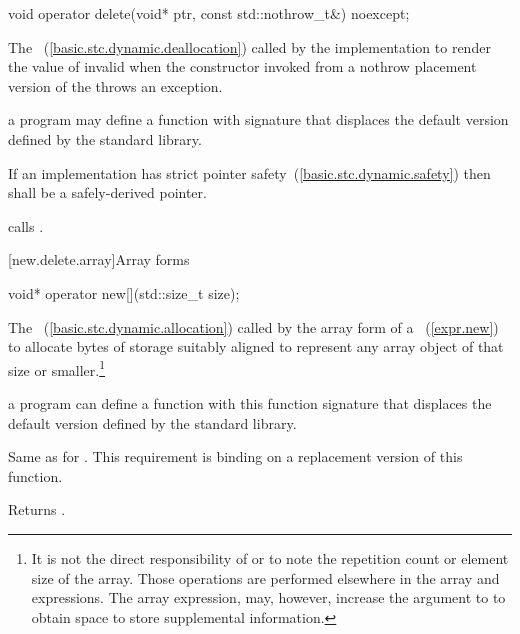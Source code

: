 %
\begin{itemdecl}
void operator delete(void* ptr, const std::nothrow_t&) noexcept;
\end{itemdecl}

\begin{itemdescr}
\pnum
\effects
The
~(\ref{basic.stc.dynamic.deallocation})
called by the implementation
to render the value of  invalid
when the constructor invoked from a nothrow
placement version of the  throws an exception.

\pnum
\replaceable
a \Cpp program may define a function with signature
that displaces the default version defined by the
\Cpp standard library.

\pnum
\requires
If an implementation has strict pointer safety~(\ref{basic.stc.dynamic.safety})
then  shall be a safely-derived pointer.

\pnum
{}
{} calls
.
\end{itemdescr}

[new.delete.array]{Array forms}

%
\begin{itemdecl}
void* operator new[](std::size_t size);
\end{itemdecl}

\begin{itemdescr}
\pnum
\effects
The
~(\ref{basic.stc.dynamic.allocation})
called by the array form of a
~(\ref{expr.new})
to allocate  bytes of storage suitably aligned to represent any array
object of that size or smaller.\footnote{It is not the direct responsibility of
or
to note the repetition count or element size of the array.
Those operations are performed elsewhere in the array
and
expressions.
The array
expression, may, however, increase the  argument to
to obtain space to store supplemental information.}

\pnum
\replaceable
a \Cpp program can define a
function with this function signature that displaces the default version
defined by the \Cpp standard library.

\pnum
\required
Same as for
.
This requirement is binding on a replacement version of this function.

\pnum
{}
Returns
.
\end{itemdescr}

